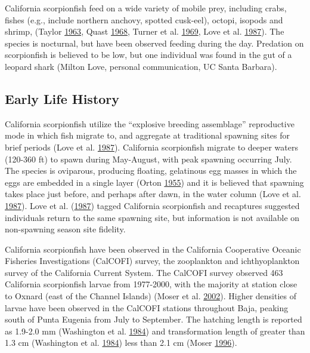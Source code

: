 \documentclass[12pt,]{article}
\begin{document}
California scorpionfish feed on a wide variety of mobile prey, including
crabs, fishes (e.g., include northern anchovy, spotted cusk-eel),
octopi, isopods and shrimp, (Taylor
\protect\hyperlink{ref-Taylor1963}{1963}, Quast
\protect\hyperlink{ref-Quast1968}{1968}, Turner et al.
\protect\hyperlink{ref-Turner1969}{1969}, Love et al.
\protect\hyperlink{ref-Love1987}{1987}). The species is nocturnal, but
have been observed feeding during the day. Predation on scorpionfish is
believed to be low, but one individual was found in the gut of a leopard
shark (Milton Love, personal communication, UC Santa Barbara).

\subsection{Early Life History}\label{early-life-history}

California scorpionfish utilize the ``explosive breeding assemblage''
reproductive mode in which fish migrate to, and aggregate at traditional
spawning sites for brief periods (Love et al.
\protect\hyperlink{ref-Love1987}{1987}). California scorpionfish migrate
to deeper waters (120-360 ft) to spawn during May-August, with peak
spawning occurring July. The species is oviparous, producing floating,
gelatinous egg masses in which the eggs are embedded in a single layer
(Orton \protect\hyperlink{ref-Orton1955}{1955}) and it is believed that
spawning takes place just before, and perhaps after dawn, in the water
column (Love et al. \protect\hyperlink{ref-Love1987}{1987}). Love et al.
(\protect\hyperlink{ref-Love1987}{1987}) tagged California scorpionfish
and recaptures suggested individuals return to the same spawning site,
but information is not available on non-spawning season site fidelity.

California scorpionfish have been observed in the California Cooperative
Oceanic Fisheries Investigations (CalCOFI) survey, the zooplankton and
ichthyoplankton survey of the California Current System. The CalCOFI
survey observed 463 California scorpionfish larvae from 1977-2000, with
the majority at station close to Oxnard (east of the Channel Islands)
(Moser et al. \protect\hyperlink{ref-Moser2002}{2002}). Higher densities
of larvae have been observed in the CalCOFI stations throughout Baja,
peaking south of Punta Eugenia from July to September. The hatching
length is reported as 1.9-2.0 mm (Washington et al.
\protect\hyperlink{ref-Washington1984}{1984}) and transformation length
of greater than 1.3 cm (Washington et al.
\protect\hyperlink{ref-Washington1984}{1984}) less than 2.1 cm (Moser
\protect\hyperlink{ref-Moser1996}{1996}).
\end{document}
